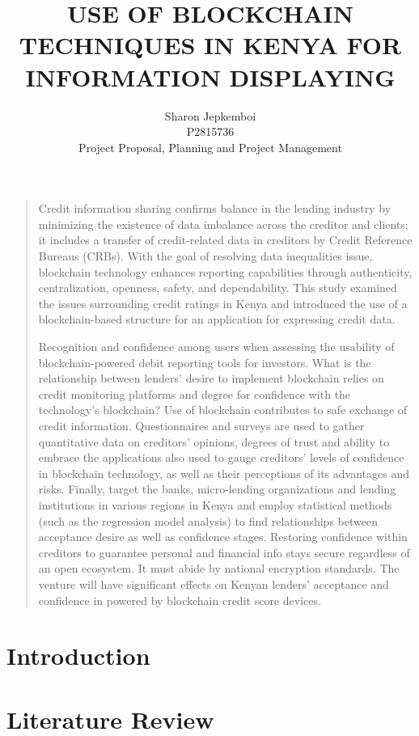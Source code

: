 \documentclass[a4paper, 12pt]{article}
\title{USE OF BLOCKCHAIN TECHNIQUES IN KENYA FOR INFORMATION DISPLAYING}
\author{Sharon Jepkemboi \\
P2815736 \\
Project Proposal, Planning and Project Management}
\newenvironment{abstract}{
    \begin{center}
        \bfseries \abstractname
    \end{center}
    \begin{quote}
}{
    \end{quote}
}
\begin{document}
\maketitle

\begin{abstract}
Credit information sharing confirms balance in the lending industry by minimizing the existence of data
imbalance across the creditor and clients; it includes a transfer of credit-related data in creditors by Credit
Reference Bureaus (CRBs). With the goal of resolving data inequalities issue, blockchain technology
enhances reporting capabilities through authenticity, centralization, openness, safety, and dependability.
This study examined the issues surrounding credit ratings in Kenya and introduced the use of a
blockchain-based structure for an application for expressing credit data.

Recognition and confidence among users when assessing the usability of blockchain-powered debit
reporting tools for investors. What is the relationship between lenders' desire to implement blockchain
relies on credit monitoring platforms and degree for confidence with the technology's blockchain? Use of
blockchain contributes to safe exchange of credit information. Questionnaires and surveys are used to
gather quantitative data on creditors' opinions, degrees of trust and ability to embrace the applications also
used to gauge creditors' levels of confidence in blockchain technology, as well as their perceptions of its
advantages and risks. Finally, target the banks, micro-lending organizations and lending institutions in
various regions in Kenya and employ statistical methods (such as the regression model analysis) to find
relationships between acceptance desire as well as confidence stages. Restoring confidence within
creditors to guarantee personal and financial info stays secure regardless of an open ecosystem. It must
abide by national encryption standards. The venture will have significant effects on Kenyan lenders'
acceptance and confidence in powered by blockchain credit score devices.
\end{abstract}

\section{Introduction}

\section{Literature Review}
\end{document}
